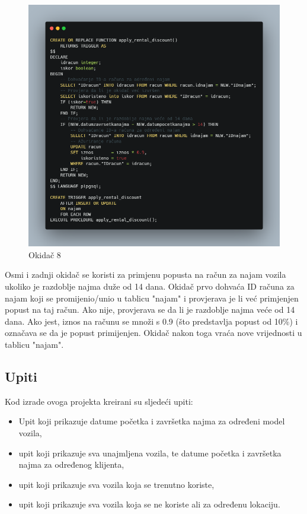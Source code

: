 \documentclass[]{foi} %
\begin{document}
\begin{figure}[!ht]
    \centering
    \includegraphics[width=1\textwidth]{slike/8.png}
    \caption{Okidač 8}
    \label{fig:osmi}
\end{figure}

Osmi i zadnji okidač se koristi za primjenu popusta na račun za najam vozila ukoliko je razdoblje najma duže od 14 dana. Okidač prvo dohvaća ID računa za najam koji se promijenio/unio u tablicu "najam" i provjerava je li već primjenjen popust na taj račun. Ako nije, provjerava se da li je razdoblje najma veće od 14 dana. Ako jest, iznos na računu se množi s 0.9 (što predstavlja popust od 10\%) i označava se da je popust primijenjen. Okidač nakon toga vraća nove vrijednosti u tablicu "najam".
\newpage

\subsection{Upiti}

Kod izrade ovoga projekta kreirani su sljedeći upiti:

\begin{itemize}
  \item Upit koji prikazuje datume početka i završetka najma za određeni model vozila,
  \item upit koji prikazuje sva unajmljena vozila, te datume početka i završetka najma za određenog klijenta,
  \item upit koji prikazuje sva vozila koja se trenutno koriste,
  \item upit koji prikazuje sva vozila koja se ne koriste ali za određenu lokaciju.
\end{itemize}
\end{document}

